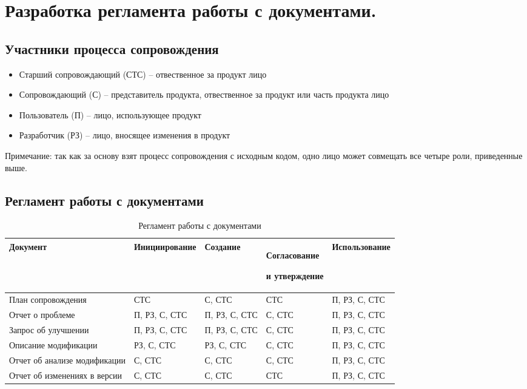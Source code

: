 
\pagebreak


\section{Разработка регламента работы с документами.}

\subsection{Участники процесса сопровождения}

\begin{itemize}
    \item Старший сопровождающий (СТС) -- отвественное за продукт лицо
    \item Сопровождающий (С) -- представитель продукта, отвественное за продукт или часть продукта лицо
    \item Пользователь (П) -- лицо, использующее продукт
    \item Разработчик (РЗ) -- лицо, вносящее изменения в продукт
\end{itemize}

Примечание: так как за основу взят процесс сопровождения с исходным кодом, одно лицо может совмещать все четыре роли, приведенные выше.

\subsection{Регламент работы с документами}

\begin{center}
    \begin{longtable}{|p{3cm}|p{3.3cm}|p{3cm}|p{3cm}|p{3cm}|}
        \caption{Регламент работы с документами} \\
        \hline
        Документ                     & Инициирование & Создание      & Согласование \par и утверждение & Использование \\
        \hline
        План сопровождения           & СТС           & С, СТС        & СТС                             & П, РЗ, С, СТС \\
        \hline
        Отчет о проблеме             & П, РЗ, С, СТС & П, РЗ, С, СТС & С, СТС                          & П, РЗ, С, СТС \\
        \hline
        Запрос об улучшении          & П, РЗ, С, СТС & П, РЗ, С, СТС & С, СТС                          & П, РЗ, С, СТС \\
        \hline
        Описание модификации         & РЗ, С, СТС    & РЗ, С, СТС    & С, СТС                          & П, РЗ, С, СТС \\
        \hline
        Отчет об анализе модификации & С, СТС        & С, СТС        & С, СТС                          & П, РЗ, С, СТС \\
        \hline
        Отчет об изменениях в версии & С, СТС        & С, СТС        & СТС                             & П, РЗ, С, СТС \\
        \hline
    \end{longtable}
\end{center}